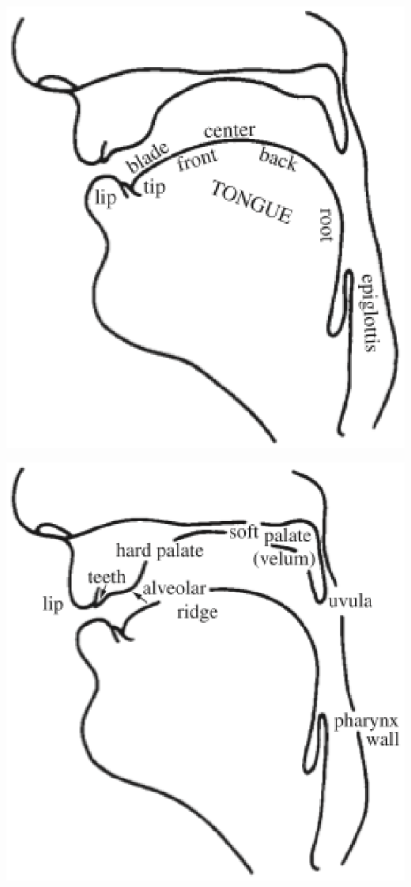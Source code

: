 \documentclass[11pt, oneside]{article}   	%
\begin{document}
\newpage

\begin{multicols}{2}

\noindent \includegraphics[scale=0.55]{tongue}

\vfill
\columnbreak

\noindent \includegraphics[scale=0.55]{vocaltract}

\end{multicols}
\end{document}
